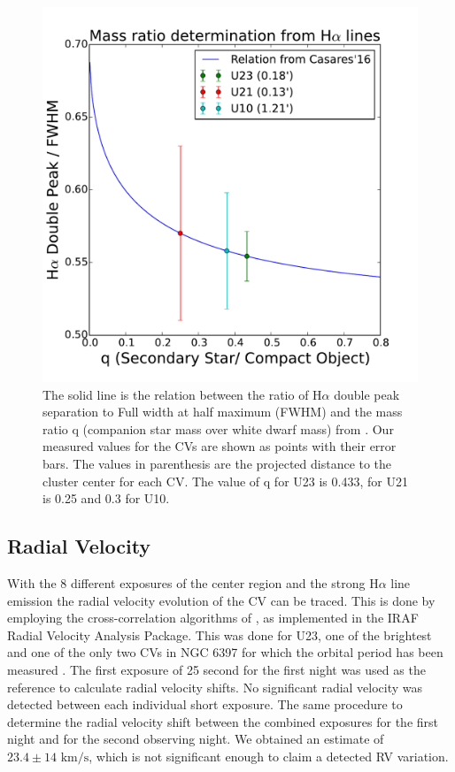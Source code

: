 \begin{figure}[]
        \centering
        \includegraphics[scale=.5]{assets/images/mass.pdf}
\caption{The solid line is the relation between the ratio of H$\alpha$ double peak separation to Full width at half maximum (FWHM) and the mass ratio q (companion star mass over white dwarf mass) from \cite{casares_massration_20016}. Our measured values for the CVs are shown as points with their error bars. The values in parenthesis are the projected distance to the cluster center for each CV. The value of q for U23 is 0.433, for U21 is 0.25 and 0.3 for U10.}
\label{fig:mass}
\end{figure}

\subsection{Radial Velocity}

With the 8 different exposures of the center region and the strong H$\alpha$ line emission the radial velocity evolution of the CV can be traced. This is done by employing the cross-correlation algorithms of \cite{tonry_cross_1979}, as implemented in the IRAF Radial Velocity Analysis Package. This was done for U23, one of the brightest and one of the only two CVs in NGC 6397 for which the orbital period has been measured \citep{kaluzny_time_2003}. The first exposure of 25 second for the first night was used as the reference to calculate radial velocity shifts. No significant radial velocity was detected between each individual short exposure.  The same procedure to determine the radial velocity shift between the combined exposures for the first night and for the second observing night. We obtained an estimate of $23.4 \pm 14 \text{ km/s}$, which is not significant enough to claim a detected RV variation. 



